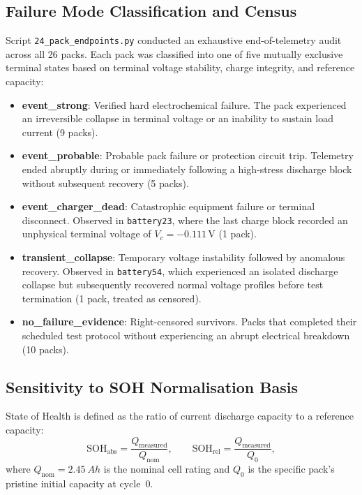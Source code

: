 \subsection{Failure Mode Classification and Census}

Script \texttt{24\_pack\_endpoints.py} conducted an exhaustive
end-of-telemetry audit across all 26 packs. Each pack was classified
into one of five mutually exclusive terminal states based on terminal
voltage stability, charge integrity, and reference capacity:
\begin{itemize}
  \item \textbf{event\_strong}: Verified hard electrochemical failure.
  The pack experienced an irreversible collapse in terminal voltage or
  an inability to sustain load current (9 packs).
  \item \textbf{event\_probable}: Probable pack failure or protection
  circuit trip. Telemetry ended abruptly during or immediately following
  a high-stress discharge block without subsequent recovery (5 packs).
  \item \textbf{event\_charger\_dead}: Catastrophic equipment failure
  or terminal disconnect. Observed in \texttt{battery23}, where the last
  charge block recorded an unphysical terminal voltage of
  $V_c = -0.111\,\mathrm{V}$ (1 pack).
  \item \textbf{transient\_collapse}: Temporary voltage instability
  followed by anomalous recovery. Observed in \texttt{battery54}, which
  experienced an isolated discharge collapse but subsequently recovered
  normal voltage profiles before test termination (1 pack, treated as censored).
  \item \textbf{no\_failure\_evidence}: Right-censored survivors. Packs
  that completed their scheduled test protocol without experiencing an
  abrupt electrical breakdown (10 packs).
\end{itemize}

\subsection{Sensitivity to SOH Normalisation Basis}

State of Health is defined as the ratio of current discharge capacity
to a reference capacity:
\begin{equation}
  \mathrm{SOH}_{\mathrm{abs}} = \frac{Q_{\mathrm{measured}}}{Q_{\mathrm{nom}}},
  \qquad
  \mathrm{SOH}_{\mathrm{rel}} = \frac{Q_{\mathrm{measured}}}{Q_0},
\end{equation}
where $Q_{\mathrm{nom}} = \SI{2.45}{Ah}$ is the nominal cell rating and
$Q_0$ is the specific pack's pristine initial capacity at cycle~0.

